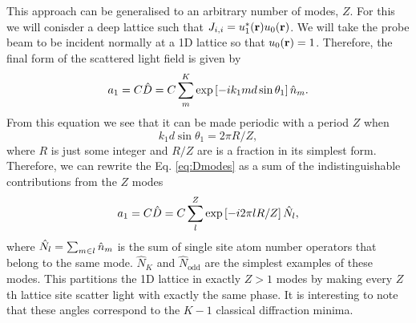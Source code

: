 This approach can be generalised to an arbitrary number of modes,
$Z$. For this we will conisder a deep lattice such that
$J_{i,i} = u_1^* (\mathbf{r}) u_0 (\mathbf{r})$. We will take the probe beam to
be incident normally at a 1D lattice so that $u_0 (\mathbf{r}) =
1$. Therefore, the final form of the scattered light field is given by
\begin{equation}
  \label{eq:Dmodes}
  a_1 = C \hat{D} = C \sum_m^K \exp\left[-i k_1 m d \sin \theta_1
  \right] \hat{n}_m.
\end{equation}
From this equation we see that it can be made periodic with a period
$Z$ when
\begin{equation}
  k_1 d \sin \theta_1 = 2\pi R / Z,
\end{equation}
where $R$ is just some integer and $R/Z$ are is a fraction in its
simplest form. Therefore, we can rewrite the Eq. \eqref{eq:Dmodes} as
a sum of the indistinguishable contributions from the $Z$ modes
\begin{equation}
  \label{eq:Zmodes}
  a_1 = C \hat{D} = C \sum_l^Z \exp\left[-i 2 \pi l R / Z \right] \hat{N}_l,
\end{equation}
where $\hat{N}_l = \sum_{m \in l} \hat{n}_m$ is the sum of single site atom
number operators that belong to the same mode. $\hat{N}_K$ and
$\hat{N}_\mathrm{odd}$ are the simplest examples of these modes. This
partitions the 1D lattice in exactly $Z > 1$ modes by making every
$Z$th lattice site scatter light with exactly the same phase. It is
interesting to note that these angles correspond to the $K-1$
classical diffraction minima.

